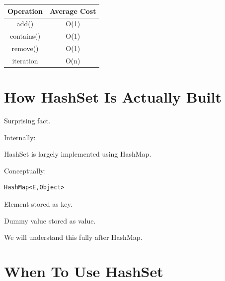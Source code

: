 \documentclass[11pt,a4paper]{book}
\begin{document}
\begin{center}

\begin{tabular}{|c|c|}
\hline
Operation & Average Cost \\
\hline

add()
&
O(1)
\\
\hline

contains()
&
O(1)
\\
\hline

remove()
&
O(1)
\\
\hline

iteration
&
O(n)
\\
\hline

\end{tabular}

\end{center}


\section{How HashSet Is Actually Built}

Surprising fact.


Internally:


HashSet is largely implemented
using HashMap.


Conceptually:

\begin{verbatim} 
HashMap<E,Object>
\end{verbatim}


Element stored as key.


Dummy value stored as value.


We will understand this fully
after HashMap.


\section{When To Use HashSet}
\end{document}
